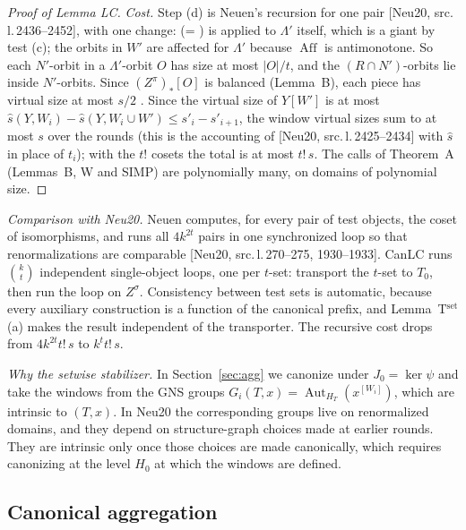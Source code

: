 \documentclass[11pt]{article}
\theoremstyle{plain}
\theoremstyle{definition}
\theoremstyle{remark}
\theoremstyle{named}
\theoremstyle{namedrm}
\newcommand{\Aut}{\operatorname{Aut}}
\newcommand{\Aff}{\operatorname{Aff}}
\newcommand{\win}[2]{#1^{[#2]}}
\newcommand{\src}[2]{[#1, src.\,l.\,#2]}
\begin{document}
\begin{proof}[Proof of Lemma LC]
\emph{Cost.} Step (d) is Neuen's recursion for one pair \src{Neu20}{2436--2452}, with one change:
\cite[Lemma~4.7]{Neu20} (= \cite[Thm.~6(b)]{Bab16}) is applied to $\Lambda'$ itself, which is a giant by test (c);
the orbits in $W'$ are affected for $\Lambda'$ because $\Aff$ is antimonotone. So each $N'$-orbit in a $\Lambda'$-orbit
$O$ has size at most $|O|/t$, and the $(R\cap N')$-orbits lie inside $N'$-orbits. Since $(Z^\pi)_*[O]$ is balanced
(Lemma~B), each piece has virtual size at most $s/2$ \cite[Obs.~4.13]{Neu20}. Since the virtual size of $Y[W']$ is at most
$\widehat s(Y,W_i)-\widehat s(Y,W_i\cup W')\le s'_i-s'_{i+1}$, the window virtual sizes sum to at most $s$ over the rounds (this is the accounting of \src{Neu20}{2425--2434} with $\widehat s$ in place of $t_i$); with the $t!$ cosets the total is at most $t!\,s$.
The calls of Theorem~A (Lemmas~B, W and SIMP) are polynomially many, on domains of polynomial size.
\end{proof}

\emph{Comparison with Neu20.} Neuen computes, for every pair of test objects, the coset of isomorphisms,
and runs all $4k^{2t}$ pairs in one synchronized loop so that renormalizations are comparable
\src{Neu20}{270--275, 1930--1933}. CanLC runs $\binom kt$ independent single-object loops, one per $t$-set:
transport the $t$-set to $T_0$, then run the loop on $Z^\sigma$. Consistency between test sets is automatic,
because every auxiliary construction is a function of the canonical prefix, and Lemma~T$^{\text{set}}$(a)
makes the result independent of the transporter. The recursive cost drops from $4k^{2t}t!\,s$ to
$k^tt!\,s$.

\emph{Why the setwise stabilizer.} In Section~\ref{sec:agg} we canonize under $J_0=\ker\psi$ and take the
windows from the GNS groups $G_i(T,x)=\Aut_{H_T}(\win{x}{W_i})$, which are intrinsic to $(T,x)$. In Neu20 the
corresponding groups live on renormalized domains, and they depend on structure-graph choices made at
earlier rounds. They are intrinsic only once those choices are made canonically, which requires
canonizing at the level $H_0$ at which the windows are defined.

\subsection{Canonical aggregation}
\end{document}
